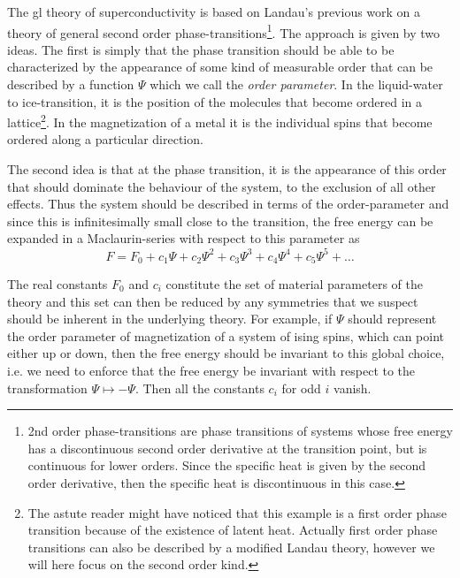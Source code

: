 The \ac{gl} theory of superconductivity is based on Landau's previous work on a theory of general second
order phase-transitions\footnote{2nd order phase-transitions are phase transitions of systems whose free energy
has a discontinuous second order derivative at the transition point, but is continuous for lower orders.
Since the specific heat is given by the second order derivative, then the specific heat is discontinuous in this case.}.
The approach is given by two ideas. The first is simply that the phase transition should be able to be characterized
by the appearance of some kind of measurable
order that can be described by a function $\Psi$ which we call the \emph{order parameter}. In the liquid-water to ice-transition,
it is the position of the molecules that become ordered in a lattice\footnote{The astute reader might have noticed that this
example is a first order phase transition because of the existence of latent heat. Actually first order phase transitions
can also be described by a modified Landau theory, however we will here focus on the second order kind.}.
In the magnetization of a metal it is the individual spins that become ordered along a particular direction.

The second idea is that at the phase transition, it is the appearance of this order that should dominate the behaviour
of the system, to the exclusion of all other effects. Thus the system should be described in terms of the order-parameter
and since this is infinitesimally small close to the transition, the free energy can be expanded in a Maclaurin-series
with respect to this parameter as
\begin{equation}
    \label{eq:statMech:LandauMaclaurin}
    F = F_0 + c_1 \Psi + c_2 \Psi^2 + c_3 \Psi^3 + c_4 \Psi^4 + c_5 \Psi^5 + \ldots
\end{equation}

The real constants $F_0$ and $c_i$ constitute the set of material parameters of the theory and this set can then
be reduced by any symmetries that we suspect should be inherent in the underlying theory. For example, if $\Psi$
should represent the order parameter of magnetization of a system of ising spins, which can point either up or
down, then the free energy should be invariant to this global choice, i.e. we need to enforce that the free energy
be invariant with respect to the transformation $\Psi \mapsto -\Psi$. Then all the constants $c_i$ for odd $i$
vanish.

